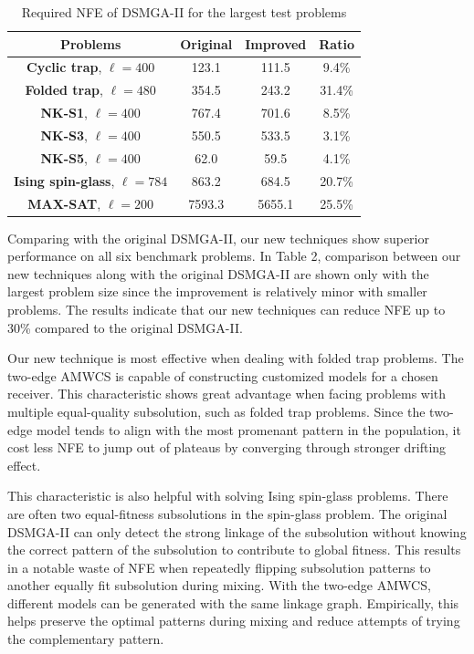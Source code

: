 \documentclass{sig-alternate-05-2015}
\begin{document}
\begin{table}[ht]
\centering
\begin{tabular}{ |c|c|c|c| } \hline
\textbf{Problems}& \textbf{Original} & \textbf{Improved} & \textbf{Ratio}\\ \hline
\textbf{Cyclic trap}, $\ell = 400$ 		& 123.1&111.5&9.4\%\\ \hline
\textbf{Folded trap}, $\ell = 480$	 	& 354.5& 243.2&31.4\%\\ \hline
\textbf{NK-S1}, $\ell = 400$ 				& 767.4& 701.6&8.5\%\\ \hline
\textbf{NK-S3}, $\ell = 400$ 				& 550.5& 533.5&3.1\%\\ \hline
\textbf{NK-S5}, $\ell = 400$ 				& 62.0& 59.5&4.1\%\\ \hline
\textbf{Ising spin-glass}, $\ell = 784$ 	& 863.2&684.5&20.7\%\\ \hline
\textbf{MAX-SAT}, $\ell = 200$ 			& 7593.3& 5655.1&25.5\%\\ \hline
\end{tabular}
\caption{Required NFE of DSMGA-II for the largest test problems}
\end{table}

Comparing with the original DSMGA-II, our new techniques show superior performance on all six benchmark problems.
In Table 2, comparison between our new techniques along with the original DSMGA-II are shown only with the largest problem size since the improvement is relatively minor with smaller problems. 
The results indicate that our new techniques can reduce NFE up to 30\% compared to the original DSMGA-II. 


Our new technique is most effective when dealing with folded trap problems.
The two-edge AMWCS is capable of constructing customized models for a chosen receiver. 
This characteristic shows great advantage when facing problems with multiple equal-quality subsolution, such as folded trap problems.
Since the two-edge model tends to align with the most promenant pattern in the population, it cost less NFE to jump out of plateaus by converging through stronger drifting effect.


This characteristic is also helpful with solving Ising spin-glass problems. 
There are often two equal-fitness subsolutions in the spin-glass problem.
The original DSMGA-II can only detect the strong linkage of the subsolution without knowing the correct pattern of the subsolution to contribute to global fitness.
This results in a notable waste of NFE when repeatedly flipping subsolution patterns to another equally fit subsolution during mixing.
With the two-edge AMWCS, different models can be generated with the same linkage graph. 
Empirically, this helps preserve the optimal patterns during mixing and reduce attempts of trying the complementary pattern.
\end{document}
